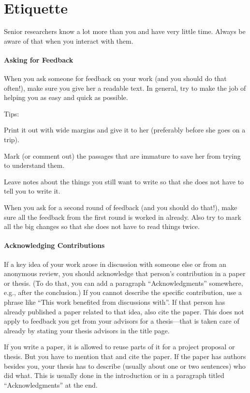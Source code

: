 \documentclass[12pt]{article}
\begin{document}
\section{Etiquette}

Senior researchers know a lot more than you and have very little time.
Always be aware of that when you interact with them.

\paragraph{Asking for Feedback}
When you ask someone for feedback on your work (and you should do that often!), make sure you give her a readable text.
In general, try to make the job of helping you as easy and quick as possible.

Tips:
\begin{compactitem}
\item Print it out with wide margins and give it to her (preferably before she goes on a trip).
\item Mark (or comment out) the passages that are immature to save her from trying to understand them.
\item Leave notes about the things you still want to write so that she does not have to tell you to write it.
\item When you ask for a second round of feedback (and you should do that!), make sure all the feedback from the first round is worked in already. Also try to mark all the big changes so that she does not have to read things twice.
\end{compactitem}

\paragraph{Acknowledging Contributions}
If a key idea of your work arose in discussion with someone else or from an anonymous review, you should acknowledge that person's contribution in a paper or thesis. (To do that, you can add a paragraph ``Acknowledgments'' somewhere, e.g., after the conclusion.)
If you cannot describe the specific contribution, use a phrase like ``This work benefited from discussions with''.
If that person has already published a paper related to that idea, also cite the paper.
This does not apply to feedback you get from your advisors for a thesis---that is taken care of already by stating your thesis advisors in the title page.

If you write a paper, it is allowed to reuse parts of it for a project proposal or thesis.
But you have to mention that and cite the paper.
If the paper has authors besides you, your thesis has to describe (usually about one or two sentences) who did what.
This is usually done in the introduction or in a paragraph titled ``Acknowledgments'' at the end.
\end{document}
